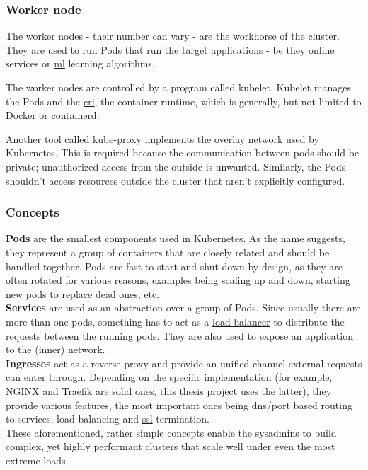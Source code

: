 \subsubsection{Worker node}
The worker nodes - their number can vary - are the workhorse of the cluster. They are used to run Pods that run the target applications - be they online services or \underline{\gls{ml}} learning algorithms.

The worker nodes are controlled by a program called kubelet. Kubelet manages the Pods and the \underline{\gls{cri}}, the container runtime, which is generally, but not limited to Docker\cite{docker} or containerd\cite{containerd}.

Another tool called kube-proxy implements the overlay network used by Kubernetes. This is required because the communication between pods should be private; unauthorized access from the outside is unwanted. Similarly, the Pods shouldn't access resources outside the cluster that aren't explicitly configured.

\subsubsection{Concepts}
\textbf{Pods} are the smallest components used in Kubernetes. As the name suggests, they represent a group of containers that are closely related and should be handled together. Pods are fast to start and shut down by design, as they are often rotated for various reasons, examples being scaling up and down, starting new pods to replace dead ones, etc. \\

\textbf{Services} are used as an abstraction over a group of Pods. Since usually there are more than one pods, something has to act as a \underline{\gls{load-balancer}} to distribute the requests between the running pods. They are also used to expose an application to the (inner) network. \\

\textbf{Ingresses} act as a reverse-proxy and provide an unified channel external requests can enter through. Depending on the specific implementation (for example, NGINX\cite{nginx} and Traefik\cite{traefik} are solid ones, this thesis project uses the latter), they provide various features, the most important ones being dns/port based routing to services, load balancing and \underline{\gls{ssl}} termination. \\

These aforementioned, rather simple concepts enable the sysadmins to build complex, yet highly performant clusters that scale well under even the most extreme loads.

